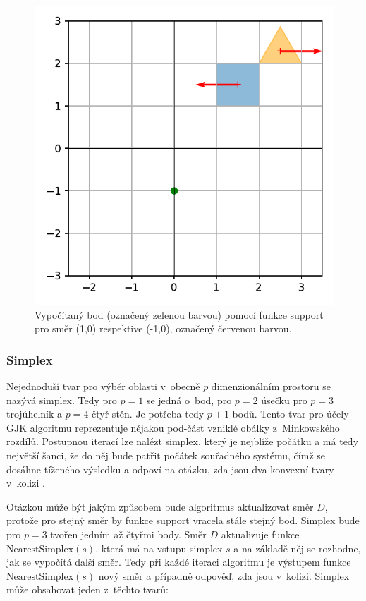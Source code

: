 \begin{figure}[t]
    \centering
    \includegraphics[scale=0.7]{obrazky-figures/gjk/support.pdf}
    \caption{Vypočítaný bod (označený zelenou barvou) pomocí funkce support pro směr (1,0) respektive (-1,0), označený červenou barvou. }
    \label{fig:supportfunction}
\end{figure}

\subsubsection{Simplex}
Nejednoduší tvar pro výběr oblasti v~obecně \(p\) dimenzionálním prostoru se nazývá simplex. Tedy pro \(p=1\) se jedná o~bod, pro \(p=2\) úsečku pro \(p=3\) trojúhelník a $p=4$ čtyř stěn. Je potřeba tedy $p+1$ bodů. Tento tvar pro účely GJK algoritmu reprezentuje nějakou pod-část vzniklé obálky z~Minkowského rozdílů. Postupnou iterací lze nalézt simplex, který je nejblíže počátku a má tedy největší šanci, že do něj bude patřit počátek souřadného systému, čímž se dosáhne tíženého výsledku a odpoví na otázku, zda jsou dva konvexní tvary v~kolizi \cite{initialGJK}.

Otázkou může být jakým způsobem bude algoritmus aktualizovat směr $D$, protože pro stejný směr by funkce support vracela stále stejný bod. Simplex bude pro $p=3$ tvořen jedním až čtyřmi body. Směr $D$ aktualizuje funkce $\mathrm {NearestSimplex} (s)$, která má na vstupu simplex $s$ a na základě něj se rozhodne, jak se vypočítá další směr. Tedy při každé iteraci algoritmu je výstupem funkce $\mathrm {NearestSimplex} (s)$ nový směr a případně odpověď, zda jsou v~kolizi. Simplex může obsahovat jeden z~těchto tvarů:

